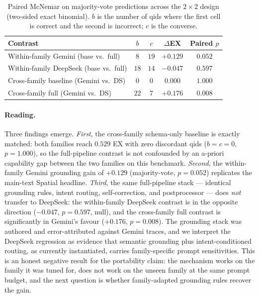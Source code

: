 \documentclass[11pt]{article}
\begin{document}
\begin{table}[h]
\centering
\caption{Paired McNemar on majority-vote predictions across the $2{\times}2$
design (two-sided exact binomial). $b$ is the number of qids where the first
cell is correct and the second is incorrect; $c$ is the converse.}
\label{tab:cross-family-paired}
\begin{tabular}{lcccc}
\toprule
Contrast & $b$ & $c$ & $\Delta$EX & Paired $p$ \\
\midrule
Within-family Gemini   (base vs.\ full)     & $8$  & $19$ & $+0.129$ & $0.052$ \\
Within-family DeepSeek (base vs.\ full)     & $18$ & $14$ & $-0.047$ & $0.597$ \\
Cross-family baseline  (Gemini vs.\ DS)     & $0$  & $0$  & $0.000$  & $1.000$ \\
Cross-family full      (Gemini vs.\ DS)     & $22$ & $7$  & $+0.176$ & $0.008$ \\
\bottomrule
\end{tabular}
\end{table}

\paragraph{Reading.} Three findings emerge. \emph{First}, the cross-family
schema-only baseline is exactly matched: both families reach $0.529$ EX with
zero discordant qids ($b=c=0$, $p=1.000$), so the full-pipeline contrast is
not confounded by an a-priori capability gap between the two families on this
benchmark. \emph{Second}, the within-family Gemini grounding gain of $+0.129$
(majority-vote, $p=0.052$) replicates the main-text Spatial headline.
\emph{Third}, the same full-pipeline stack --- identical grounding rules,
intent routing, self-correction, and postprocessor --- does \emph{not}
transfer to DeepSeek: the within-family DeepSeek contrast is in the opposite
direction ($-0.047$, $p=0.597$, null), and the cross-family full contrast is
significantly in Gemini's favour ($+0.176$, $p=0.008$). The grounding stack
was authored and error-attributed against Gemini traces, and we interpret the
DeepSeek regression as evidence that semantic grounding plus intent-conditioned
routing, as currently instantiated, carries family-specific prompt
sensitivities. This is an honest negative result for the portability claim:
the mechanism works on the family it was tuned for, does not work on the
unseen family at the same prompt budget, and the next question is whether
family-adapted grounding rules recover the gain.
\end{document}
